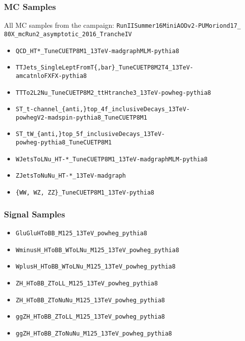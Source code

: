 \documentclass{beamer}
\newcommand{\backupend}{
  \addtocounter{framenumbervorappendix}{-\value{framenumber}}
  \addtocounter{framenumber}{\value{framenumbervorappendix}}
}
\begin{document}
\begin{frame}
  \frametitle{MC Samples}
  All MC samples from the campaign: \texttt{RunIISummer16MiniAODv2-PUMoriond17\_ \\
    80X\_mcRun2\_asymptotic\_2016\_TrancheIV}

  \vspace{12pt}

  {\footnotesize
    \begin{itemize}
    \item \texttt{QCD\_HT*\_TuneCUETP8M1\_13TeV-madgraphMLM-pythia8}
    \item \texttt{TTJets\_SingleLeptFromT\{,bar\}\_TuneCUETP8M2T4\_13TeV- \\
      amcatnloFXFX-pythia8}
    \item \texttt{TTTo2L2Nu\_TuneCUETP8M2\_ttHtranche3\_13TeV-powheg-pythia8}
    \item \texttt{ST\_t-channel\_\{anti,\}top\_4f\_inclusiveDecays\_13TeV- \\
      powhegV2-madspin-pythia8\_TuneCUETP8M1}
    \item \texttt{ST\_tW\_\{anti,\}top\_5f\_inclusiveDecays\_13TeV- \\
      powheg-pythia8\_TuneCUETP8M1}
    \item \texttt{WJetsToLNu\_HT-*\_TuneCUETP8M1\_13TeV-madgraphMLM-pythia8}
    \item \texttt{ZJetsToNuNu\_HT-*\_13TeV-madgraph}
    \item \texttt{\{WW, WZ, ZZ\}\_TuneCUETP8M1\_13TeV-pythia8}
    \end{itemize}
  }
\end{frame}

\begin{frame}
  \frametitle{Signal Samples}

  {
    \begin{itemize}
    \item \texttt{GluGluHToBB\_M125\_13TeV\_powheg\_pythia8}
    \item \texttt{WminusH\_HToBB\_WToLNu\_M125\_13TeV\_powheg\_pythia8}
    \item \texttt{WplusH\_HToBB\_WToLNu\_M125\_13TeV\_powheg\_pythia8}
    \item \texttt{ZH\_HToBB\_ZToLL\_M125\_13TeV\_powheg\_pythia8}
    \item \texttt{ZH\_HToBB\_ZToNuNu\_M125\_13TeV\_powheg\_pythia8}
    \item \texttt{ggZH\_HToBB\_ZToLL\_M125\_13TeV\_powheg\_pythia8}
    \item \texttt{ggZH\_HToBB\_ZToNuNu\_M125\_13TeV\_powheg\_pythia8}
    \end{itemize}
  }
\end{frame}

%

\backupend
\end{document}
